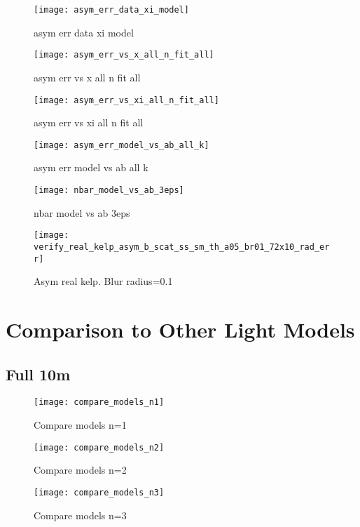 \begin{figure}[H]
  \centering
  \texttt{[image: asym\_err\_data\_xi\_model]}
  \caption{asym err data xi model}
  \label{fig:asym_err_data_xi_model}
\end{figure}

\begin{figure}[H]
  \centering
  \texttt{[image: asym\_err\_vs\_x\_all\_n\_fit\_all]}
  \caption{asym err vs x all n fit all}
  \label{fig:asym_err_vs_x_all_n_fit_all}
\end{figure}

\begin{figure}[H]
  \centering
  \texttt{[image: asym\_err\_vs\_xi\_all\_n\_fit\_all]}
  \caption{asym err vs xi all n fit all}
  \label{fig:asym_err_vs_xi_all_n_fit_all}
\end{figure}

\begin{figure}[H]
  \centering
  \texttt{[image: asym\_err\_model\_vs\_ab\_all\_k]}
  \caption{asym err model vs ab all k}
  \label{fig:asym_err_model_vs_ab_all_k}
\end{figure}

\begin{figure}[H]
  \centering
  \texttt{[image: nbar\_model\_vs\_ab\_3eps]}
  \caption{nbar model vs ab 3eps}
  \label{fig:nbar_model_vs_ab_3eps}
\end{figure}

\begin{figure}[H]
  \centering
  \texttt{[image: verify\_real\_kelp\_asym\_b\_scat\_ss\_sm\_th\_a05\_br01\_72x10\_rad\_err]}
  \caption{Asym real kelp. Blur radius=0.1}
  \label{fig:asym_real_kelp_br01}
\end{figure}

\section{Comparison to Other Light Models}


\subsection{Full 10m}
\begin{figure}[H]
  \centering
  \texttt{[image: compare\_models\_n1]}
  \caption{Compare models n=1}
  \label{fig:compare_models_n1}
\end{figure}
\begin{figure}[H]
  \centering
  \texttt{[image: compare\_models\_n2]}
  \caption{Compare models n=2}
  \label{fig:compare_models_n2}
\end{figure}
\begin{figure}[H]
  \centering
  \texttt{[image: compare\_models\_n3]}
  \caption{Compare models n=3}
  \label{fig:compare_models_n3}
\end{figure}

